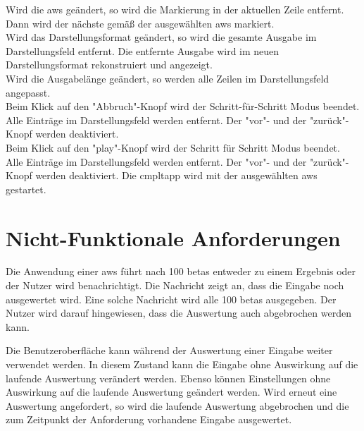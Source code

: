 \documentclass[parskip=full,11pt,twoside]{scrartcl}
\begin{document}
Wird die \gls{aws} geändert, so wird die Markierung in der aktuellen Zeile entfernt.
Dann wird der nächste  gemäß der ausgewählten \gls{aws} markiert.\\
Wird das Darstellungsformat geändert, so wird die gesamte Ausgabe im Darstellungsfeld entfernt.
Die entfernte Ausgabe wird im neuen Darstellungsformat rekonstruiert und angezeigt.\\
Wird die Ausgabelänge geändert, so werden alle Zeilen im Darstellungsfeld angepasst.\\
Beim Klick auf den "Abbruch"-Knopf wird der Schritt-für-Schritt Modus beendet.
Alle Einträge im Darstellungsfeld werden entfernt.
Der "vor"- und der "zurück"-Knopf werden deaktiviert.\\
Beim Klick auf den "play"-Knopf wird der Schritt für Schritt Modus beendet.
Alle Einträge im Darstellungsfeld werden entfernt.
Der "vor"- und der "zurück"-Knopf werden deaktiviert.
Die \gls{cmpltapp} wird mit der ausgewählten \gls{aws} gestartet.


\section{Nicht-Funktionale Anforderungen}


Die Anwendung einer \gls{aws} führt nach 100 \glspl{beta} entweder zu einem Ergebnis oder der Nutzer wird benachrichtigt.
Die Nachricht zeigt an, dass die Eingabe noch ausgewertet wird.
Eine solche Nachricht wird alle 100 \glspl{beta} ausgegeben.
Der Nutzer wird darauf hingewiesen, dass die Auswertung auch abgebrochen werden kann.

Die Benutzeroberfläche kann während der Auswertung einer Eingabe weiter verwendet werden.
In diesem Zustand kann die Eingabe ohne Auswirkung auf die laufende Auswertung verändert werden.
Ebenso können Einstellungen ohne Auswirkung auf die laufende Auswertung geändert werden.
Wird erneut eine Auswertung angefordert, so wird die laufende Auswertung abgebrochen und die zum Zeitpunkt der Anforderung vorhandene Eingabe ausgewertet.
\end{document}
